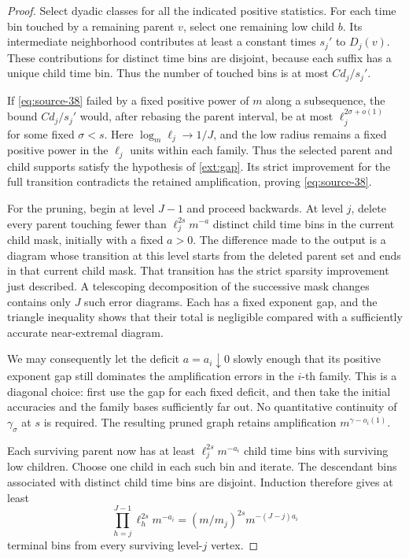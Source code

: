 \begin{proof}
Select dyadic classes for all the indicated positive statistics.
For each time bin touched by a remaining parent \(v\), select
one remaining low child \(b\). Its intermediate neighborhood
contributes at least a constant times \(s_j'\) to \(D_j(v)\).
These contributions for distinct time bins are disjoint, because
each suffix has a unique child time bin. Thus the number of
touched bins is at most \(C d_j/s_j'\).

If \eqref{eq:source-38} failed by a fixed positive power of \(m\)
along a subsequence, the bound \(C d_j/s_j'\) would, after rebasing
the parent interval, be at most \(\ell_j^{2\sigma+o(1)}\) for some
fixed \(\sigma<s\). Here \(\log_m\ell_j\to1/J\), and the low radius
remains a fixed positive power in the \(\ell_j\) units within each
family. Thus the selected parent and child supports satisfy the
hypothesis of \eqref{ext:gap}. Its strict improvement for the full
transition contradicts the retained amplification, proving
\eqref{eq:source-38}.

For the pruning, begin at level \(J-1\) and proceed backwards.
At level \(j\), delete every parent touching fewer than
\(\ell_j^{2s}m^{-a}\) distinct child time bins in the current child
mask, initially with a fixed \(a>0\). The difference made to the
output is a diagram whose transition at this level starts from
the deleted parent set and ends in that current child mask.
That transition has the strict sparsity improvement just
described. A telescoping decomposition of the successive
mask changes contains only \(J\) such error diagrams. Each has
a fixed exponent gap, and the triangle inequality shows that
their total is negligible compared with a sufficiently accurate
near-extremal diagram.

We may consequently let the deficit \(a=a_i\downarrow0\) slowly
enough that its positive exponent gap still dominates the
amplification errors in the \(i\)-th family. This is a diagonal
choice: first use the gap for each fixed deficit, and then take
the initial accuracies and the family bases sufficiently far
out. No quantitative continuity of \(\gamma_\sigma\) at \(s\)
is required. The resulting pruned graph retains amplification
\(m^{\gamma-o_i(1)}\).

Each surviving parent now has at least
\(\ell_j^{2s}m^{-a_i}\) child time bins with surviving low children.
Choose one child in each such bin and iterate. The descendant
bins associated with distinct child time bins are disjoint.
Induction therefore gives at least
\[
 \prod_{h=j}^{J-1}\ell_h^{2s}m^{-a_i}
             =(m/m_j)^{2s}m^{-(J-j)a_i}
\]
terminal bins from every surviving level-\(j\) vertex.


\end{proof}
